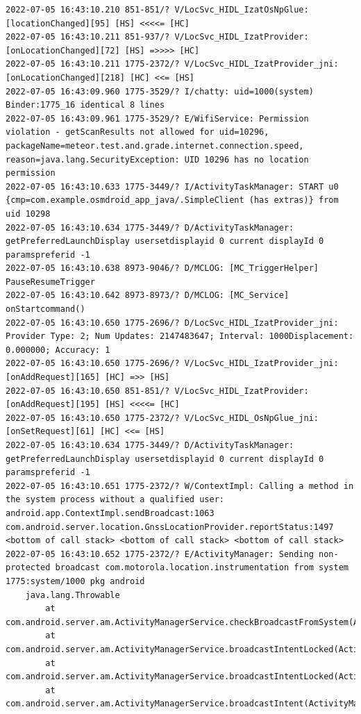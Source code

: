 \documentclass[a4paper,12pt]{book}
\begin{document}
\begin{lstlisting}
2022-07-05 16:43:10.210 851-851/? V/LocSvc_HIDL_IzatOsNpGlue: [locationChanged][95] [HS] <<<<= [HC]
2022-07-05 16:43:10.211 851-937/? V/LocSvc_HIDL_IzatProvider: [onLocationChanged][72] [HS] =>>>> [HC]
2022-07-05 16:43:10.211 1775-2372/? V/LocSvc_HIDL_IzatProvider_jni: [onLocationChanged][218] [HC] <<= [HS]
2022-07-05 16:43:09.960 1775-3529/? I/chatty: uid=1000(system) Binder:1775_16 identical 8 lines
2022-07-05 16:43:09.961 1775-3529/? E/WifiService: Permission violation - getScanResults not allowed for uid=10296, packageName=meteor.test.and.grade.internet.connection.speed, reason=java.lang.SecurityException: UID 10296 has no location permission
2022-07-05 16:43:10.633 1775-3449/? I/ActivityTaskManager: START u0 {cmp=com.example.osmdroid_app_java/.SimpleClient (has extras)} from uid 10298
2022-07-05 16:43:10.634 1775-3449/? D/ActivityTaskManager: getPreferredLaunchDisplay usersetdisplayid 0 current displayId 0 paramspreferid -1
2022-07-05 16:43:10.638 8973-9046/? D/MCLOG: [MC_TriggerHelper] PauseResumeTrigger
2022-07-05 16:43:10.642 8973-8973/? D/MCLOG: [MC_Service] onStartcommand()
2022-07-05 16:43:10.650 1775-2696/? D/LocSvc_HIDL_IzatProvider_jni: Provider Type: 2; Num Updates: 2147483647; Interval: 1000Displacement: 0.000000; Accuracy: 1
2022-07-05 16:43:10.650 1775-2696/? V/LocSvc_HIDL_IzatProvider_jni: [onAddRequest][165] [HC] =>> [HS]
2022-07-05 16:43:10.650 851-851/? V/LocSvc_HIDL_IzatProvider: [onAddRequest][195] [HS] <<<<= [HC]
2022-07-05 16:43:10.650 1775-2372/? V/LocSvc_HIDL_OsNpGlue_jni: [onSetRequest][61] [HC] <<= [HS]
2022-07-05 16:43:10.634 1775-3449/? D/ActivityTaskManager: getPreferredLaunchDisplay usersetdisplayid 0 current displayId 0 paramspreferid -1
2022-07-05 16:43:10.651 1775-2372/? W/ContextImpl: Calling a method in the system process without a qualified user: android.app.ContextImpl.sendBroadcast:1063 com.android.server.location.GnssLocationProvider.reportStatus:1497 <bottom of call stack> <bottom of call stack> <bottom of call stack> 
2022-07-05 16:43:10.652 1775-2372/? E/ActivityManager: Sending non-protected broadcast com.motorola.location.instrumentation from system 1775:system/1000 pkg android
    java.lang.Throwable
        at com.android.server.am.ActivityManagerService.checkBroadcastFromSystem(ActivityManagerService.java:15425)
        at com.android.server.am.ActivityManagerService.broadcastIntentLocked(ActivityManagerService.java:15979)
        at com.android.server.am.ActivityManagerService.broadcastIntentLocked(ActivityManagerService.java:15442)
        at com.android.server.am.ActivityManagerService.broadcastIntent(ActivityManagerService.java:16227)

\end{lstlisting}
\end{document}

